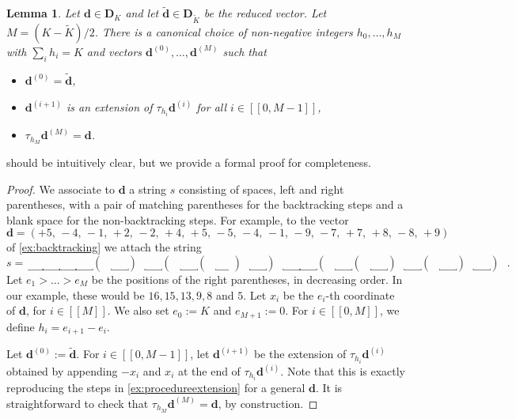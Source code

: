 \documentclass[11pt]{amsart}
\newtheorem{lemma}[theorem]{Lemma}
\theoremstyle{definition}
\newcommand{\interval}[2]{[\![#1,#2]\!] }
\newcommand{\sinterval}[1]{[\![#1]\!] }
\renewcommand{\d}{\boldsymbol{d}}
\newcommand{\fancyD}{\mathbf{D}}
\newcommand{\Dsf}{\fancyD_{\!\repK}}
\newcommand{\Dsfmix}[1]{\fancyD_{\!#1}}
\newcommand{\repK}{K}
\newcommand{\redK}{\widetilde{{K}}}
\newcommand{\Redd}{\widetilde{\d}}
\begin{document}
\begin{lemma}
\label{lem:generation}
Let $\d\in \Dsf$ and let $\Redd \in \Dsfmix{\redK}$ be the reduced vector. Let $M = (\repK - \redK)/2$. There is a canonical choice of non-negative integers $h_0,\ldots, h_M$ with $\sum_i h_i = \repK$ and vectors $\d^{(0)}, \ldots, \d^{(M)}$ such that
\begin{itemize}
	\item $\d^{(0)} = \Redd$,
	\item $\d^{(i+1)}$ is an extension of $\tau_{h_i}\d^{(i)}$ for all $i\in \interval{0}{M-1}$,
	\item $\tau_{h_M} \d^{(M)} = \d$.
\end{itemize}
\end{lemma}
 should be intuitively clear, but we provide a formal proof for completeness.
\begin{proof}
We associate to $\d$ a string $s$ consisting of spaces, left and right parentheses, with a pair of matching parentheses for the backtracking steps and a blank space for the non-backtracking steps. For example, to the vector 
\begin{equation*}
	\d = (+5,\,-4,\,-1,\,+2,\,-2,\,+4,\,+5,\,-5,\,-4,\,-1,\,-9,\,-7,\,+7,\,+8,\,-8,\,+9)
\end{equation*}
of \cref{ex:backtracking} we attach the string 
\begin{equation*}
	s = \underbracket{\phantom{lllll}} \underbracket{\phantom{lllll}} \underbracket{\phantom{lllll}} \underbracket{\phantom{lllll}}\!\!\!\!\!\!(\,\,\,\,\,
	\underbracket{\phantom{lllll}}\!\!\!\!\!\!)\,\,\,\,  \underbracket{\phantom{lllll}}\!\!\!\!\!\!(\,\,\,\,\, \underbracket{\phantom{lllll}} \!\!\!\!\!\!(\,\,\,\,\,
	\underbracket{\phantom{lllll}}\!\!\!\!\!\!)\,\,\,\, \underbracket{\phantom{lllll}}\!\!\!\!\!\!)\,\,\,\,\underbracket{\phantom{lllll}} \underbracket{\phantom{lllll}} \!\!\!\!\!\!(\,\,\,\,\,
	\underbracket{\phantom{lllll}}\!\!\!\!\!\!(\,\,\,\,\, \underbracket{\phantom{lllll}}\!\!\!\!\!\!)\,\,\,\, \underbracket{\phantom{lllll}}\!\!\!\!\!\!(\,\,\,\,\, 
	\underbracket{\phantom{lllll}} \!\!\!\!\!\!)\,\,\,\,\underbracket{\phantom{lllll}}\!\!\!\!\!\!)\,\,\,\,.
\end{equation*}
Let $e_{1}>\ldots>e_M$ be the positions of the right parentheses, in decreasing order. In our example, these would be $16, 15, 13, 9, 8$ and $5$. Let $x_i$ be the $e_i$-th coordinate of $\d$, for $i\in \sinterval{M}$. We also set $e_0 := \repK$ and $e_{M+1} := 0$. For $i\in \interval{0}{M}$, we define $h_i = e_{i+1} - e_i$. 

Let $\d^{(0)} := \Redd$. For $i\in \interval{0}{M-1}$, let $\d^{(i+1)}$ be the extension of $\tau_{h_i}\d^{(i)}$ obtained by appending $-x_i$ and $x_i$ at the end of $\tau_{h_i}\d^{(i)}$. Note that this is exactly reproducing the steps in \cref{ex:procedureextension} for a general $\d$. It is straightforward to check that $\tau_{h_M} \d^{(M)} = \d$, by construction.
\end{proof}
\end{document}
